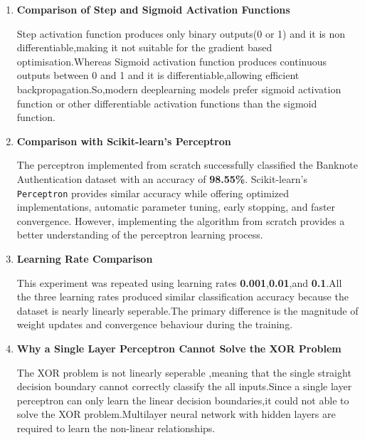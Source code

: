 \documentclass[11pt]{article}
\begin{document}
\begin{enumerate}[leftmargin=*]

\item \textbf{Comparison of Step and Sigmoid Activation Functions}

Step activation function produces only binary outputs(0 or 1) and it is non differentiable,making it not suitable for the gradient based optimisation.Whereas Sigmoid activation function produces continuous outputs between 0 and 1 and it is differentiable,allowing efficient backpropagation.So,modern deeplearning models prefer sigmoid activation function or other differentiable activation functions than the sigmoid function.


\vspace{3mm}

\item \textbf{Comparison with Scikit-learn's Perceptron}


The perceptron implemented from scratch successfully classified the Banknote Authentication dataset with an accuracy of \textbf{98.55\%}. Scikit-learn's \texttt{Perceptron} provides similar accuracy while offering optimized implementations, automatic parameter tuning, early stopping, and faster convergence. However, implementing the algorithm from scratch provides a better understanding of the perceptron learning process.

\vspace{3mm}

\item \textbf{Learning Rate Comparison}

This experiment was repeated using learning rates \textbf{0.001},\textbf{0.01},and \textbf{0.1}.All the three learning rates produced similar classification accuracy because the
dataset is nearly linearly seperable.The primary difference is the magnitude of weight updates and convergence behaviour during the training.

\vspace{3mm}

\item \textbf{Why a Single Layer Perceptron Cannot Solve the XOR Problem}

The XOR problem is not linearly seperable ,meaning that the single straight decision boundary cannot correctly classify the all inputs.Since a single layer perceptron can only learn the linear decision boundaries,it could not able to solve the XOR problem.Multilayer neural network with hidden layers are required to learn the non-linear relationships.


\end{enumerate}
\end{document}
